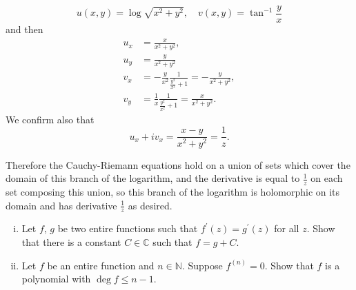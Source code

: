 \documentclass{article}
\newcounter{Problem}
\newenvironment{Problem}{\begin{Exercise}[name={Problem},
                                          counter={Problem}]}
                        {\end{Exercise}}
\begin{document}
\begin{Answer}
\begin{itemize}
{      $$
      u(x, y) = \log \sqrt{x^2 + y^2}, \quad
      v(x, y) = \tan^{-1} \frac{y}{x}
      $$
      and then
      \begin{align*}
      u_x &= \frac{x}{x^2 + y^2}, \\
      u_y &= \frac{y}{x^2 + y^2} \\
      v_x &= -\frac{y}{x^2}\frac{1}{\frac{y^2}{x^2} + 1}
           = -\frac{y}{x^2 + y^2}, \\
      v_y &= \frac{1}{x}\frac{1}{\frac{y^2}{x^2} + 1}
           = \frac{x}{x^2 + y^2}.
      \end{align*}
      We confirm also that
      $$
      u_x + i v_x = \frac{x - y}{x^2 + y^2} = \frac{1}{z}.
      $$
    }
  \end{itemize}
  Therefore the Cauchy-Riemann equations hold on a union of sets which
  cover the domain of this branch of the logarithm, and the derivative
  is equal to $\frac{1}{z}$ on each set composing this union, so this
  branch of the logarithm is holomorphic on its domain and has
  derivative $\frac{1}{z}$ as desired.
\end{Answer}

\begin{Problem}
  \begin{enumerate}[(i)]
    \item{
      Let $f$, $g$ be two entire functions such that
      $f^\prime(z) = g^\prime(z)$ for all $z$. Show that there is a
      constant $C \in \mathbb{C}$ such that $f = g + C$.
    }
    \item{
      Let $f$ be an entire function and $n \in \mathbb{N}$.
      Suppose $f^{(n)} = 0$. Show that $f$ is a polynomial
      with $\deg f \leq n - 1$.
    }
  \end{enumerate}
\end{Problem}
\end{document}

